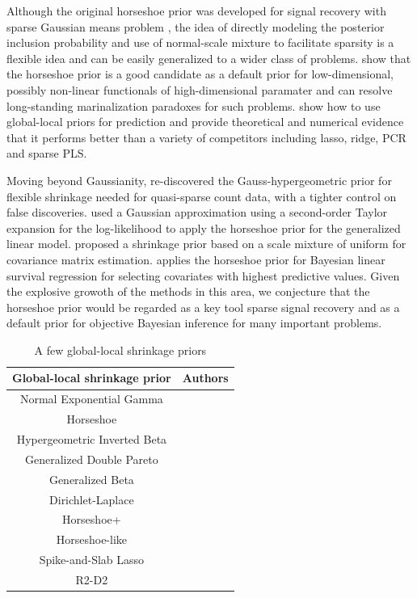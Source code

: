 \documentclass[11pt]{article}
\numberwithin{equation}{section}
\begin{document}
Although the original horseshoe prior was developed for signal recovery with sparse Gaussian means problem , the idea of directly modeling the posterior inclusion probability and use of normal-scale mixture to facilitate sparsity is a flexible idea and can be easily generalized to a wider class of problems. \citet{bhadra2015default} show that the horseshoe prior is a good candidate as a default prior for low-dimensional, possibly non-linear functionals of high-dimensional paramater and can resolve long-standing marinalization paradoxes for such problems. \citet{bhadra2016prediction} show how to use global-local priors for prediction and provide theoretical and numerical evidence that it performs better than a variety of competitors including lasso, ridge, PCR and sparse PLS. 

Moving beyond Gaussianity, \citet{datta2016bayesian} re-discovered the Gauss-hypergeometric prior for flexible shrinkage needed for quasi-sparse count data, with a tighter control on false discoveries. \citet{piironen2016hyperprior} used a Gaussian approximation using a second-order Taylor expansion for the log-likelihood to apply the horseshoe prior for the generalized linear model. \citet{wang2013class} proposed a shrinkage prior based on a scale mixture of uniform for covariance matrix estimation. \citet{peltola2014hierarchical} applies the horseshoe prior for Bayesian linear survival regression for selecting covariates with highest predictive values. Given the explosive growoth of the methods in this area, we conjecture that the horseshoe prior would be regarded as a key tool sparse signal recovery and as a default prior for objective Bayesian inference for many important problems. 

\begin{table}[htbp]
  \centering
  \caption{A few global-local shrinkage priors}
  \footnotesize{
    \begin{tabular}{|c|c|}
    \hline
    Global-local shrinkage prior  & Authors  \bigstrut\\
    \hline
    Normal Exponential Gamma & \citet{griffin2005alternative} \bigstrut[t]\\
    Horseshoe & \citet{carvalho2010horseshoe, carvalho2009handling} \\
    Hypergeometric Inverted Beta & \citet{polson2010large} \\
    Generalized Double Pareto & \citet{armagan2011generalized} \\
    Generalized Beta  & \citet{armagan2013generalized} \\
    Dirichlet-Laplace & \citet{bhattacharya2014dirichlet} \\
    Horseshoe+  & \citet{bhadra2015horseshoe+} \\
    Horseshoe-like & \citet{bhadra2017horseshoe} \\
    Spike-and-Slab Lasso & \citet{rovckova2016spike} \\
    R2-D2 & \citet{zhang2016high} \bigstrut[b]\\
    \hline
    \end{tabular}%
    }
  \label{tab:one-gps}%
\end{table}%
\end{document}
